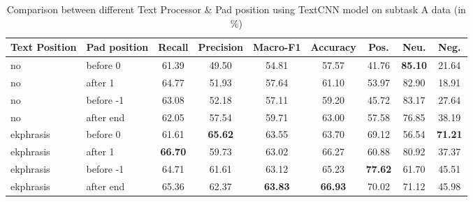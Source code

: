 \begin{table*}[htbp!] %
    \centering
    \begin{tabular}{llccccccc}
    \midrule
    Text Position  &  Pad position          & Recall         & Precision       & Macro-F1        & Accuracy & Pos. &Neu. & Neg.\\
    \midrule
    no   & before 0  & 61.39 & 49.50 & 54.81 & 57.57 & 41.76 & \bf85.10 & 21.64 \\
    no  & after 1   & 64.77 & 51.93 & 57.64 & 61.10 & 53.97 & 82.90 & 18.91 \\
    no  & before -1 & 63.08 & 52.18 & 57.11 & 59.20 & 45.72 & 83.17 & 27.64 \\
    no  & after end & 62.05 & 57.54 & 59.71 & 63.00 & 57.58 & 76.85 & 38.19 \\
    ekphrasis   & before 0  & 61.61 & \bf65.62 & 63.55 & 63.70 & 69.12 & 56.54 & \bf71.21 \\
    ekphrasis  & after 1   & \bf66.70 & 59.73 & 63.02 & 66.27 & 60.88 & 80.92 & 37.37 \\
    ekphrasis  & before -1 & 64.71 & 61.61 & 63.12 & 65.23 & \bf77.62 & 61.70 & 45.51 \\
    ekphrasis  & after end & 65.36 & 62.37 & \bf63.83 & \bf66.93 & 70.02 & 71.12 & 45.98 \\

    \bottomrule
    \end{tabular}
\caption{Comparison between different Text Processor \& Pad position using TextCNN model on subtask A data (in \%)}
\label{tab:text_cnn}
\end{table*}
